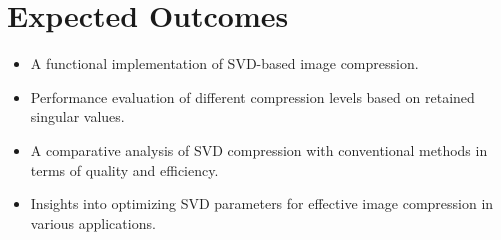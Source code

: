 \documentclass[a4paper,12pt]{article}
\begin{document}
\section{Expected Outcomes}
\begin{itemize}
    \item A functional implementation of SVD-based image compression.
    \item Performance evaluation of different compression levels based on retained singular values.
    \item A comparative analysis of SVD compression with conventional methods in terms of quality and efficiency.
    \item Insights into optimizing SVD parameters for effective image compression in various applications.
\end{itemize}
\end{document}

